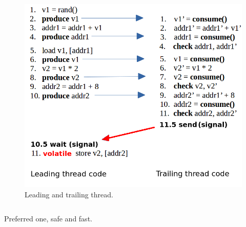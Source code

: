 \documentclass[xcolor=pdftex,dvipsnames,table]{beamer}
\begin{document}
\begin{frame}
\begin{columns}[c]
		\column{3in}        
        	\begin{figure}[H]
        		\begin{center}
                	\captionsetup{labelformat=empty,labelsep=none}
                	\includegraphics[scale=0.3]{Semi-Sync-CommunicationSyncing.png} 
                	\caption{Leading and trailing thread.}
                \end{center}
        	\end{figure}
            
    \end{columns} \pause
    
   	\begin{shaded}
    	\centerline{Preferred one, safe and fast.} 
    \end{shaded}
          
                  
\end{frame}
   
\end{document}
